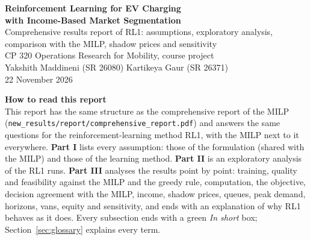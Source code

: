 \documentclass[11pt,a4paper]{article}
\begin{document}
\begin{center}
{\LARGE\bfseries\color{headblue} Reinforcement Learning for EV Charging\\[2pt] with Income-Based Market Segmentation}\\[8pt]
{\large Comprehensive results report of RL1: assumptions, exploratory analysis,\\ comparison with the MILP, shadow prices and sensitivity}\\[6pt]
{\normalsize CP 320 Operations Research for Mobility, course project}\\[2pt]
{\normalsize Yakshith Maddineni (SR 26080) \quad\textperiodcentered\quad Kartikeya Gaur (SR 26371)}\\[2pt]
{\normalsize 22 November 2026}
\end{center}

\begin{keybox}
{\color{headblue}\textbf{How to read this report}}\\
This report has the same structure as the comprehensive report of the MILP (\texttt{new\_results/report/comprehensive\_report.pdf}) and answers the same questions for the reinforcement-learning method RL1, with the MILP next to it everywhere. \textbf{Part I} lists every assumption: those of the formulation (shared with the MILP) and those of the learning method. \textbf{Part II} is an exploratory analysis of the \NInstR{} RL1 runs. \textbf{Part III} analyses the results point by point: training, quality and feasibility against the MILP and the greedy rule, computation, the objective, decision agreement with the MILP, income, shadow prices, queues, peak demand, horizons, vans, equity and sensitivity, and ends with an explanation of why RL1 behaves as it does. Every subsection ends with a green \emph{In short} box; Section~\ref{sec:glossary} explains every term.
\end{keybox}
\end{document}

